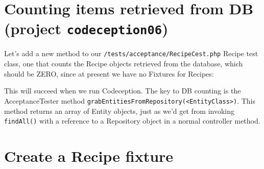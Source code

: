 \documentclass[a4paperpaper,openright]{book}
\newenvironment{Shaded}{}{}
\newcommand{\CommentTok}[1]{\textcolor[rgb]{0.38,0.63,0.69}{\textit{#1}}}
\newcommand{\DecValTok}[1]{\textcolor[rgb]{0.25,0.63,0.44}{#1}}
\newcommand{\FunctionTok}[1]{\textcolor[rgb]{0.02,0.16,0.49}{#1}}
\newcommand{\KeywordTok}[1]{\textcolor[rgb]{0.00,0.44,0.13}{\textbf{#1}}}
\newcommand{\NormalTok}[1]{#1}
\newcommand{\OtherTok}[1]{\textcolor[rgb]{0.00,0.44,0.13}{#1}}
\newcommand{\StringTok}[1]{\textcolor[rgb]{0.25,0.44,0.63}{#1}}
\begin{document}
\hypertarget{counting-items-retrieved-from-db-project-codeception06}{%
\section{\texorpdfstring{Counting items retrieved from DB (project
\texttt{codeception06})}{Counting items retrieved from DB (project codeception06)}}\label{counting-items-retrieved-from-db-project-codeception06}}

Let's add a new method to our \texttt{/tests/acceptance/RecipeCest.php}
Recipe test class, one that counts the Recipe objects retrieved from the
database, which should be ZERO, since at present we have no Fixtures for
Recipes:

\begin{Shaded}
\end{Shaded}

This will succeed when we run Codeception. The key to DB counting is the
AcceptanceTester method
\texttt{grabEntitiesFromRepository(\textless{}EntityClass\textgreater{})}.
This method returns an array of Entity objects, just as we'd get from
invoking \texttt{findAll()} with a reference to a Repository object in a
normal controller method.

\hypertarget{create-a-recipe-fixture}{%
\section{Create a Recipe fixture}\label{create-a-recipe-fixture}}
\end{document}
